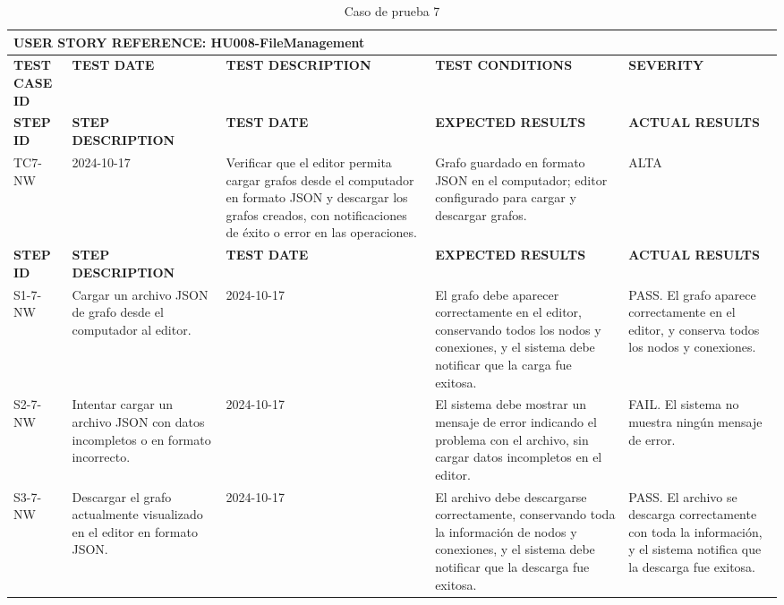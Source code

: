 \documentclass[stu, 12pt, letterpaper, donotrepeattitle, floatsintext, natbib]{apa7}
\begin{document}
\begin{longtable}{|p{2cm}|p{3cm}|p{3cm}|p{3cm}|p{3cm}|}
    \caption{Caso de prueba 7} \label{tab:casos_prueba7} \\
    \hline
        \multicolumn{5}{|l|}{\textbf{USER STORY REFERENCE: HU008-FileManagement}} \\ \hline

    \textbf{TEST CASE ID} & \textbf{TEST DATE} & \textbf{TEST DESCRIPTION} & \textbf{TEST CONDITIONS} & \textbf{SEVERITY} \\ \hline
    \endfirsthead
    \hline
    \textbf{STEP ID} & \textbf{STEP DESCRIPTION} & \textbf{TEST DATE} & \textbf{EXPECTED RESULTS} & \textbf{ACTUAL RESULTS} \\ \hline
    \endhead
    TC7-NW & 2024-10-17 & Verificar que el editor permita cargar grafos desde el computador en formato JSON y descargar los grafos creados, con notificaciones de éxito o error en las operaciones. & Grafo guardado en formato JSON en el computador; editor configurado para cargar y descargar grafos. & ALTA \\ \hline
    \textbf{STEP ID} & \textbf{STEP DESCRIPTION} & \textbf{TEST DATE} & \textbf{EXPECTED RESULTS} & \textbf{ACTUAL RESULTS} \\ \hline
    S1-7-NW & Cargar un archivo JSON de grafo desde el computador al editor. & 2024-10-17 & El grafo debe aparecer correctamente en el editor, conservando todos los nodos y conexiones, y el sistema debe notificar que la carga fue exitosa. & PASS. El grafo aparece correctamente en el editor, y conserva todos los nodos y conexiones. \\ \hline
    S2-7-NW & Intentar cargar un archivo JSON con datos incompletos o en formato incorrecto. & 2024-10-17 & El sistema debe mostrar un mensaje de error indicando el problema con el archivo, sin cargar datos incompletos en el editor. & FAIL. El sistema no muestra ningún mensaje de error. \\ \hline
    S3-7-NW & Descargar el grafo actualmente visualizado en el editor en formato JSON. & 2024-10-17 & El archivo debe descargarse correctamente, conservando toda la información de nodos y conexiones, y el sistema debe notificar que la descarga fue exitosa. & PASS. El archivo se descarga correctamente con toda la información, y el sistema notifica que la descarga fue exitosa. \\ \hline
\end{longtable}
\end{document}
